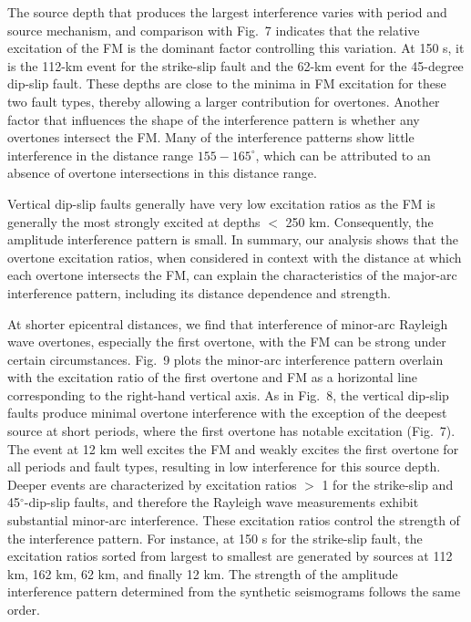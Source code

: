 \documentclass[extra,mreferee]{gji}
\begin{document}
The source depth that produces the largest interference varies with period and source mechanism, and comparison with Fig.\ 7 indicates that the relative excitation of the FM is the dominant factor controlling this variation. At 150 s, it is the 112-km event for the strike-slip fault and the 62-km event for the 45-degree dip-slip fault. These depths are close to the minima in FM excitation for these two fault types, thereby allowing a larger contribution for overtones. Another factor that influences the shape of the interference pattern is whether any overtones intersect the FM. Many of the interference patterns show little interference in the distance range $155-165^\circ$, which can be attributed to an absence of overtone intersections in this distance range.  
 
Vertical dip-slip faults generally have very low excitation ratios as the FM is generally the most strongly excited at depths $<$ 250 km. Consequently, the amplitude interference pattern is small. In summary, our analysis shows that the overtone excitation ratios, when considered in context with the distance at which each overtone intersects the FM, can explain the characteristics of the major-arc interference pattern, including its distance dependence and strength. 

At shorter epicentral distances, we find that interference of minor-arc Rayleigh wave overtones, especially the first overtone, with the FM can be strong under certain circumstances. Fig.\ 9 plots the minor-arc interference pattern overlain with the excitation ratio of the first overtone and FM as a horizontal line corresponding to the right-hand vertical axis. As in Fig.\ 8, the vertical dip-slip faults produce minimal overtone interference with the exception of the deepest source at short periods, where the first overtone has notable excitation (Fig.\ 7). The event at 12 km well excites the FM and weakly excites the first overtone for all periods and fault types, resulting in low interference for this source depth. Deeper events are characterized by excitation ratios $>$ 1 for the strike-slip and 45$^\circ$-dip-slip faults, and therefore the Rayleigh wave measurements exhibit substantial minor-arc interference. These excitation ratios control the strength of the interference pattern. For instance, at 150 s for the strike-slip fault, the excitation ratios sorted from largest to smallest are generated by sources at 112 km, 162 km, 62 km, and finally 12 km. The strength of the amplitude interference pattern determined from the synthetic seismograms follows the same order. 
\end{document}
